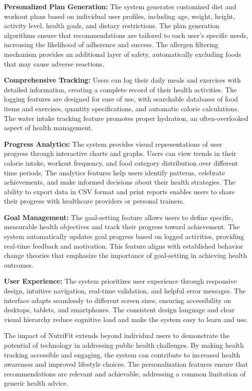 \textbf{Personalized Plan Generation:} The system generates customized diet and workout plans based on individual user profiles, including age, weight, height, activity level, health goals, and dietary restrictions. The plan generation algorithms ensure that recommendations are tailored to each user's specific needs, increasing the likelihood of adherence and success. The allergen filtering mechanism provides an additional layer of safety, automatically excluding foods that may cause adverse reactions.

\textbf{Comprehensive Tracking:} Users can log their daily meals and exercises with detailed information, creating a complete record of their health activities. The logging features are designed for ease of use, with searchable databases of food items and exercises, quantity specifications, and automatic calorie calculations. The water intake tracking feature promotes proper hydration, an often-overlooked aspect of health management.

\textbf{Progress Analytics:} The system provides visual representations of user progress through interactive charts and graphs. Users can view trends in their calorie intake, workout frequency, and food category distribution over different time periods. The analytics features help users identify patterns, celebrate achievements, and make informed decisions about their health strategies. The ability to export data in CSV format and print reports enables users to share their progress with healthcare providers or personal trainers.

\textbf{Goal Management:} The goal-setting feature allows users to define specific, measurable health objectives and track their progress toward achievement. The system automatically updates goal progress based on logged activities, providing real-time feedback and motivation. This feature aligns with established behavior change theories that emphasize the importance of goal-setting in achieving health outcomes.

\textbf{User Experience:} The system prioritizes user experience through responsive design, intuitive navigation, real-time validation, and helpful error messages. The interface adapts seamlessly to different screen sizes, ensuring accessibility on desktops, tablets, and smartphones. The consistent design language and clear visual hierarchy reduce cognitive load and make the system easy to learn and use.

The impact of NutriFit extends beyond individual users to demonstrate the potential of technology in addressing public health challenges. By making health tracking accessible and engaging, the system can contribute to increased health awareness and improved lifestyle choices. The personalization features ensure that recommendations are relevant and achievable, addressing a common limitation of generic health advice.

